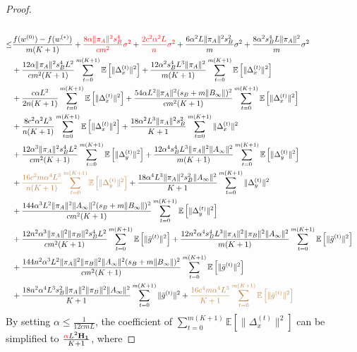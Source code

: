 \documentclass{article}
\newcommand{\EE}[1]{\mathbb{E}\left[#1\right]}
\newcommand{\norm}[1]{\| #1 \|}
\begin{document}
\begin{proof}
\begin{align*}
  \\\leq& \frac{f(w^{(0)})-f(w^{(*)})}{m(K+1)}+\textcolor{red}{\frac{8\alpha \norm{\pi_A}^2s_B^4}{cm^2}\sigma^2}+\textcolor{red}{ \frac{2c^2\alpha^2L}{n}\sigma^2}+\frac{6\alpha^2L\norm{\pi_A}^2s_B^2}{m}\sigma^2+\frac{8\alpha^2s_B^4L\norm{\pi_A}^2}{m}\sigma^2\\&+\frac{12\alpha \norm{\pi_A}^2s_B^4L^2}{cm^2(K+1)}\sum_{t=0}^{m(K+1)}\EE{\norm{\Delta_x^{(t)}}^2}+\frac{12\alpha^2s_B^4L^3\norm{\pi_A}^2}{m(K+1)}\sum_{t=0}^{m(K+1)}\EE{\norm{\Delta_x^{(t)}}^2}\\&+\frac{c\alpha L^2}{2n(K+1)}\sum_{t=0}^{m(K+1)}\EE{\norm{\Delta_x^{(t)}}^2}+\frac{54\alpha L^2\norm{\pi_A}^2(s_B+m\norm{B_{\infty}})^2}{cm^2(K+1)}\sum_{t=0}^{m(K+1)}\EE{\norm{\Delta_x^{(t)}}^2}\\&+\frac{8c^2\alpha^2L^3}{n(K+1)}\sum_{t=0}^{m(K+1)}\EE{\norm{\Delta_x^{(t)}}^2}+\frac{18\alpha^2L^3\norm{\pi_A}^2s_B^2}{ K+1}\sum_{t=0}^{m(K+1)}\norm{\Delta_x^{(t)}}^2\\&+\frac{12\alpha^3\norm{\pi_A}^2s_B^4L^2}{cm^2(K+1)}\sum_{t=0}^{m(K+1)}\EE{\norm{\Delta_y^{(t)}}^2}+\frac{12\alpha^4s_B^4L^3\norm{\pi_A}^2\norm{A_{\infty}}^2}{m(K+1)}\sum_{t=0}^{m(K+1)}\EE{\norm{\Delta_y^{(t)}}^2}\\&+\textcolor{brown}{\frac{16c^2m\alpha^4L^3}{n(K+1)}\sum_{t=0}^{m(K+1)}\EE{\norm{\Delta_y^{(t)}}^2}}+\frac{18\alpha^4L^3\norm{\pi_A}^2s_B^2\norm{A_{\infty}}^2}{ K+1}\sum_{t=0}^{m(K+1)}\norm{\Delta_y^{(t)}}^2\\&+\frac{144\alpha^3L^2\norm{\pi_A}^2\norm{A_{\infty}}^2(s_B+m\norm{B_{\infty}})^2}{cm^2(K+1)}\sum_{t=0}^{m(K+1)}\EE{\norm{\Delta_y^{(t)}}^2}\\&+\frac{12n^2\alpha^3\norm{\pi_A}^2\norm{\pi_B}^2s_B^4L^2}{cm^2(K+1)}\sum_{t=0}^{m(K+1)}\EE{\norm{\bar{g}^{(t)}}^2}+\frac{12n^2\alpha^4s_B^4L^3\norm{\pi_A}^2\norm{\pi_B}^2\norm{A_{\infty}}^2}{m(K+1)}\sum_{t=0}^{m(K+1)}\EE{\norm{\bar{g}^{(t)}}^2}
    \\&+\frac{144n^2\alpha^3L^2\norm{\pi_A}^2\norm{\pi_B}^2\norm{A_{\infty}}^2(s_B+m\norm{B_{\infty}})^2}{cm^2(K+1)}\sum_{t=0}^{m(K+1)}\EE{\norm{\bar{g}^{(t)}}^2}
    \\&+\frac{18n^2\alpha^4L^3s_B^2\norm{\pi_A}^2\norm{\pi_B}^2\norm{A_{\infty}}^2}{ K+1}\sum_{t=0}^{m(K+1)}\norm{\bar{g}^{(t)}}^2+\textcolor{brown}{\frac{16c^4m\alpha^4L^3}{K+1}\sum_{t=0}^{m(K+1)}\EE{\norm{\bar{g}^{(t)}}^2}}
  \end{align*}
  By setting $\alpha \leq \frac{1}{12cmL}$, the coefficient of $\sum_{t=0}^{m(K+1)}\EE{\norm{\Delta_x^{(t)}}^2}$ can be simplified to $\frac{\textcolor{red}{\alpha}L^2\mathbf{H_1}}{K+1}$, where

\end{proof}
\end{document}
